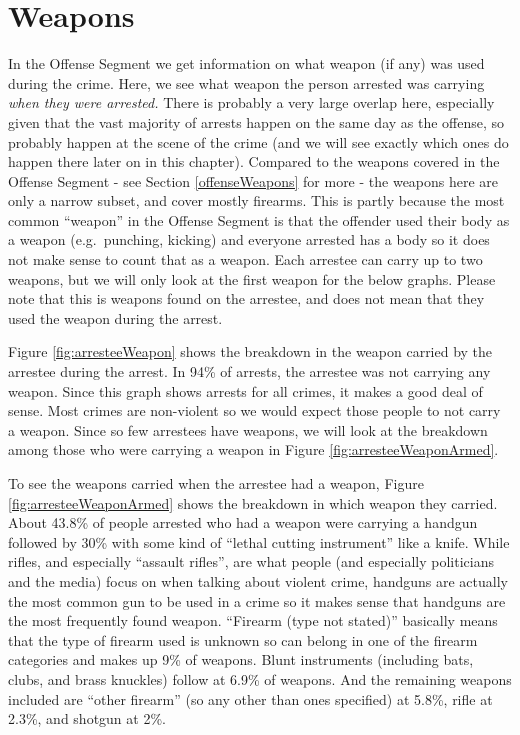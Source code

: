 \documentclass[
]{krantz}
\begin{document}
\section{Weapons}\label{weapons}

In the Offense Segment we get information on what weapon (if
any) was used during the crime. Here, we see what weapon the
person arrested was carrying \emph{when they were arrested.}
There is probably a very large overlap here, especially
given that the vast majority of arrests happen on the same
day as the offense, so probably happen at the scene of the
crime (and we will see exactly which ones do happen there
later on in this chapter). Compared to the weapons covered
in the Offense Segment - see Section \ref{offenseWeapons}
for more - the weapons here are only a narrow subset, and
cover mostly firearms. This is partly because the most
common ``weapon'' in the Offense Segment is that the
offender used their body as a weapon (e.g.~punching,
kicking) and everyone arrested has a body so it does not
make sense to count that as a weapon. Each arrestee can
carry up to two weapons, but we will only look at the first
weapon for the below graphs. Please note that this is
weapons found on the arrestee, and does not mean that they
used the weapon during the arrest.

Figure \ref{fig:arresteeWeapon} shows the breakdown in the
weapon carried by the arrestee during the arrest. In 94\% of
arrests, the arrestee was not carrying any weapon. Since
this graph shows arrests for all crimes, it makes a good
deal of sense. Most crimes are non-violent so we would
expect those people to not carry a weapon. Since so few
arrestees have weapons, we will look at the breakdown among
those who were carrying a weapon in Figure
\ref{fig:arresteeWeaponArmed}.

To see the weapons carried when the arrestee had a weapon,
Figure \ref{fig:arresteeWeaponArmed} shows the breakdown in
which weapon they carried. About 43.8\% of people arrested
who had a weapon were carrying a handgun followed by 30\%
with some kind of ``lethal cutting instrument'' like a
knife. While rifles, and especially ``assault rifles'', are
what people (and especially politicians and the media) focus
on when talking about violent crime, handguns are actually
the most common gun to be used in a crime so it makes sense
that handguns are the most frequently found weapon.
``Firearm (type not stated)'' basically means that the type
of firearm used is unknown so can belong in one of the
firearm categories and makes up 9\% of weapons. Blunt
instruments (including bats, clubs, and brass knuckles)
follow at 6.9\% of weapons. And the remaining weapons
included are ``other firearm'' (so any other than ones
specified) at 5.8\%, rifle at 2.3\%, and shotgun at 2\%.
\end{document}
